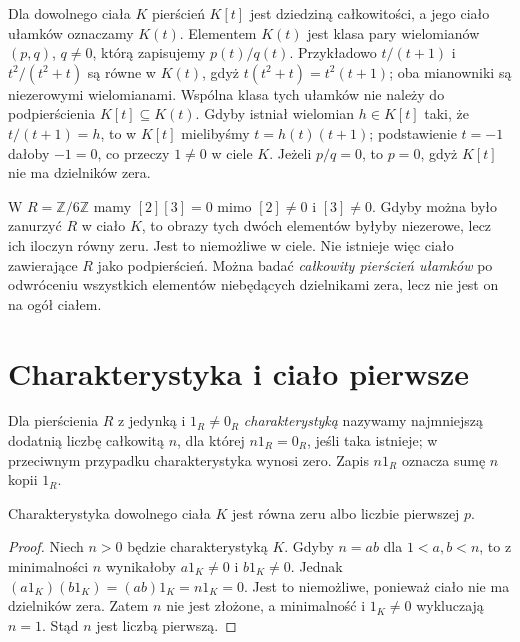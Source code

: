 \begin{przyklad}
\label{aa:prz:rational-functions}
Dla dowolnego ciała $K$ pierścień $K[t]$ jest dziedziną
całkowitości, a jego ciało ułamków oznaczamy $K(t)$.
Elementem $K(t)$ jest klasa pary wielomianów $(p,q)$,
$q\ne0$, którą zapisujemy $p(t)/q(t)$.
Przykładowo $t/(t+1)$ i $t^2/(t^2+t)$ są równe
w $K(t)$, gdyż $t(t^2+t)=t^2(t+1)$;
oba mianowniki są niezerowymi wielomianami.
Wspólna klasa tych ułamków nie należy do podpierścienia
$K[t]\subseteq K(t)$. Gdyby istniał wielomian $h\in K[t]$
taki, że $t/(t+1)=h$, to w $K[t]$ mielibyśmy
$t=h(t)(t+1)$; podstawienie $t=-1$ dałoby $-1=0$,
co przeczy $1\ne0$ w ciele $K$.
Jeżeli $p/q=0$, to $p=0$, gdyż $K[t]$ nie ma
dzielników zera.
\end{przyklad}

\begin{przyklad}
\label{aa:prz:frac-zero-divisors}
W $R=\mathbb Z/6\mathbb Z$ mamy $[2][3]=0$ mimo
$[2]\ne0$ i $[3]\ne0$. Gdyby można było zanurzyć
$R$ w ciało $K$, to obrazy tych dwóch elementów byłyby
niezerowe, lecz ich iloczyn równy zeru. Jest to niemożliwe
w ciele. Nie istnieje więc ciało zawierające $R$ jako
podpierścień. Można badać \emph{całkowity pierścień ułamków}
po odwróceniu wszystkich elementów niebędących dzielnikami
zera, lecz nie jest on na ogół ciałem.
\end{przyklad}

\section{Charakterystyka i ciało pierwsze}
\begin{definicja}
\label{aa:def:field-characteristic}
Dla pierścienia $R$ z jedynką i $1_R\ne0_R$
\emph{charakterystyką} nazywamy najmniejszą dodatnią
liczbę całkowitą $n$, dla której $n1_R=0_R$, jeśli
taka istnieje; w przeciwnym przypadku charakterystyka
wynosi zero. Zapis $n1_R$ oznacza sumę $n$ kopii $1_R$.
\end{definicja}

\begin{twierdzenie}
\label{aa:tw:field-characteristic-prime}
Charakterystyka dowolnego ciała $K$ jest równa zeru
albo liczbie pierwszej $p$.
\end{twierdzenie}
\begin{proof}
Niech $n>0$ będzie charakterystyką $K$.
Gdyby $n=ab$ dla $1<a,b<n$, to z minimalności $n$
wynikałoby $a1_K\ne0$ i $b1_K\ne0$.
Jednak $(a1_K)(b1_K)=(ab)1_K=n1_K=0$.
Jest to niemożliwe, ponieważ ciało nie ma dzielników zera.
Zatem $n$ nie jest złożone, a minimalność i $1_K\ne0$
wykluczają $n=1$. Stąd $n$ jest liczbą pierwszą.
\end{proof}

